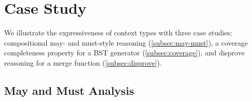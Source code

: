\section{Case Study}\label{sec:case}

We illustrate the expressiveness of context types with three
case studies: compositional may- and must-style reasoning
(\autoref{subsec:may-must}), a coverage completeness property for a BST
generator (\autoref{subsec:coverage}), and disprove reasoning for a merge
function (\autoref{subsec:disprove}).

\subsection{May and Must Analysis}\label{subsec:may-must}


